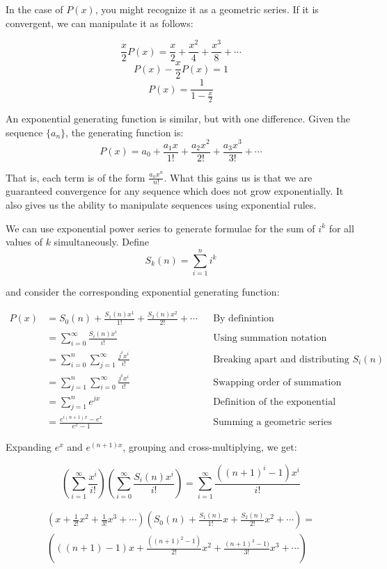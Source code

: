 \documentclass{article}
\begin{document}
In the case of $P(x)$, you might recognize it as a geometric series. If it is convergent,
we can manipulate it as follows:

\[ \frac{x}{2} P(x) = \frac{x}{2} + \frac{x^2}{4} + \frac{x^3}{8} + \cdots \]
\[ P(x) - \frac{x}{2} P(x) = 1 \]
\[ P(x) = \frac{1}{1-\frac{x}{2}} \]

An exponential generating function is similar, but with one difference. Given the sequence
$\{a_n\}$, the generating function is:
\[ P(x) = a_0 + \frac{a_1x}{1!} + \frac{a_2x^2}{2!} + \frac{a_3x^3}{3!} + \cdots \]

That is, each term is of the form $\frac{a_nx^n}{n!}$. What this gains us is that we are
guaranteed convergence for any sequence which does not grow exponentially. It also gives
us the ability to manipulate sequences using exponential rules.

We can use exponential power series to generate formulae for the sum of $i^k$ for all
values of $k$ simultaneously. Define
\[ S_k(n) = \sum_{i=1}^{n} i^k \]

and consider the corresponding exponential generating function:

\begin{align*}
	P(x) &= S_0(n) + \frac{S_1(n)x^1}{1!} + \frac{S_2(n)x^2}{2!} + \cdots 
	&  & \text{By definintion} \\
	&= \sum_{i=0}^{\infty} \frac{S_i(n)x^i}{i!} &  & \text{Using summation notation} \\
	&= \sum_{i=0}^{n} \sum_{j=1}^{\infty} \frac{j^ix^i}{i!} &  & 
	\text{Breaking apart and distributing } S_i(n) \\
	&= \sum_{j=1}^{n} \sum_{i=0}^{\infty} \frac{j^ix^i}{i!} &  & 
	\text{Swapping order of summation} \\
	&= \sum_{j=1}^{n} e^{jx} &  & \text{Definition of the exponential function} \\
	&= \frac{e^{i(n+1)x}-e^x}{e^{x}-1} &  & \text{Summing a geometric series}
\end{align*}

Expanding $e^x$ and $e^{(n+1)x}$, grouping and cross-multiplying, we get:

\[ \left( \sum_{i=1}^{\infty} \frac{x^i}{i!} \right) 
	\left( \sum_{i=0}^{\infty} \frac{S_i(n)x^i}{i!}\right) = 
	\sum_{i=1}^{\infty} \frac{((n+1)^i - 1)x^i}{i!} \]

\begin{multline*}
	\left( x+\frac{1}{2!}x^2 + \frac{1}{3!}x^3 + \cdots \right)
	\left( S_0(n) + \frac{S_1(n)}{1!}x + \frac{S_2(n)}{2!}x^2 + \cdots \right) = \\
	\left( ((n+1) - 1)x+\frac{((n+1)^2-1)}{2!}x^2 + \frac{(n+1)^3-1)}{3!}x^3 + \cdots \right)
\end{multline*}
\end{document}
